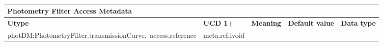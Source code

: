 \documentclass[11pt,a4paper]{ivoa}
\begin{document}
\begin{appendices}



\newpage



\begin{table}[H]
\centering
\begin{adjustbox}{angle=90}
\begin{tabular}{p{2.5in}|p{1.5in}|p{2in}|p{0.74in}|p{0.35in}}
\multicolumn{5}{p{\dimexpr6.59in+8\tabcolsep\relax}}{\centering 
{\fontsize{10pt}{12.0pt}\selectfont \textbf{Photometry Filter Access Metadata}}} \\
\hline
\multicolumn{1}{p{2.5in}}{{\fontsize{8pt}{8pt}\selectfont \textbf{Utype}}} &
\multicolumn{1}{p{1.5in}}{{\fontsize{8pt}{8pt}\selectfont \textbf{UCD 1+}}} &
\multicolumn{1}{p{2in}}{{\fontsize{8pt}{8pt}\selectfont \textbf{Meaning}}} &
\multicolumn{1}{p{0.74in}}{{\fontsize{8pt}{8pt}\selectfont \textbf{Default value}}} &
\multicolumn{1}{p{0.35in}}{{\fontsize{8pt}{8pt}\selectfont \textbf{Data type}}} \\
\hline
\multicolumn{1}{p{2.5in}}{{\fontsize{8pt}{8pt}
\selectfont photDM:PhotometryFilter.transmissionCurve.\ access.reference}} &
\multicolumn{1}{p{1.5in}}{{\fontsize{8pt}{8pt}\selectfont meta.ref.ivoid }} &


\end{tabular}
\end{adjustbox}
\end{table}
\end{appendices}
\end{document}
